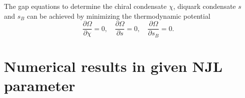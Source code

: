 \documentclass[prd, showpacs,nofootinbib,amsmath,amssymb]{revtex4}
\begin{document}
The gap equations to determine the chiral condensate $\chi$, diquark condensate $s$
and $s_B$ can be achieved by minimizing the thermodynamic potential
\begin{equation}
	\label{eq:gap}
	\frac{\partial \Omega}{\partial \chi} =0,\quad
	\frac{\partial \Omega}{\partial s} =0,\quad
	\frac{\partial \Omega}{\partial s_B} =0.
\end{equation}















\section{Numerical results in given NJL parameter}
\label{2}
\end{document}
